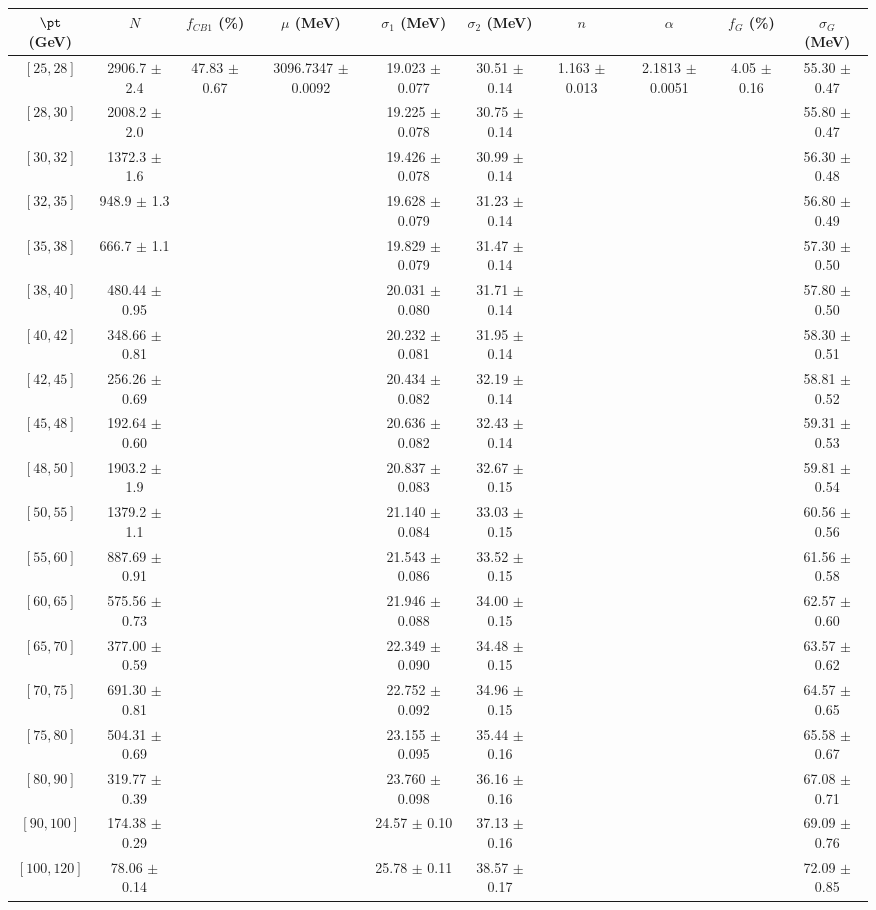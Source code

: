 \begin{tabular}{c||c|c|c|c|c|c|c|c|c}
$\pt$ (GeV) & $N$ & $f_{CB1}$ (\%)  & $\mu$ (MeV) & $\sigma_1$ (MeV) & $\sigma_2$ (MeV) & $n$ & $\alpha$ & $f_G$ (\%) & $\sigma_G$ (MeV) \\
\hline
$[25, 28]$ & 2906.7 $\pm$ 2.4 & \multirow{19}{*}{47.83 $\pm$ 0.67} & \multirow{19}{*}{3096.7347 $\pm$ 0.0092} & 19.023 $\pm$ 0.077 & 30.51 $\pm$ 0.14 & \multirow{19}{*}{1.163 $\pm$ 0.013} & \multirow{19}{*}{2.1813 $\pm$ 0.0051} & \multirow{19}{*}{4.05 $\pm$ 0.16} & 55.30 $\pm$ 0.47\\
$[28, 30]$ & 2008.2 $\pm$ 2.0 &  &  & 19.225 $\pm$ 0.078 & 30.75 $\pm$ 0.14 &  &  &  & 55.80 $\pm$ 0.47\\
$[30, 32]$ & 1372.3 $\pm$ 1.6 &  &  & 19.426 $\pm$ 0.078 & 30.99 $\pm$ 0.14 &  &  &  & 56.30 $\pm$ 0.48\\
$[32, 35]$ & 948.9 $\pm$ 1.3 &  &  & 19.628 $\pm$ 0.079 & 31.23 $\pm$ 0.14 &  &  &  & 56.80 $\pm$ 0.49\\
$[35, 38]$ & 666.7 $\pm$ 1.1 &  &  & 19.829 $\pm$ 0.079 & 31.47 $\pm$ 0.14 &  &  &  & 57.30 $\pm$ 0.50\\
$[38, 40]$ & 480.44 $\pm$ 0.95 &  &  & 20.031 $\pm$ 0.080 & 31.71 $\pm$ 0.14 &  &  &  & 57.80 $\pm$ 0.50\\
$[40, 42]$ & 348.66 $\pm$ 0.81 &  &  & 20.232 $\pm$ 0.081 & 31.95 $\pm$ 0.14 &  &  &  & 58.30 $\pm$ 0.51\\
$[42, 45]$ & 256.26 $\pm$ 0.69 &  &  & 20.434 $\pm$ 0.082 & 32.19 $\pm$ 0.14 &  &  &  & 58.81 $\pm$ 0.52\\
$[45, 48]$ & 192.64 $\pm$ 0.60 &  &  & 20.636 $\pm$ 0.082 & 32.43 $\pm$ 0.14 &  &  &  & 59.31 $\pm$ 0.53\\
$[48, 50]$ & 1903.2 $\pm$ 1.9 &  &  & 20.837 $\pm$ 0.083 & 32.67 $\pm$ 0.15 &  &  &  & 59.81 $\pm$ 0.54\\
$[50, 55]$ & 1379.2 $\pm$ 1.1 &  &  & 21.140 $\pm$ 0.084 & 33.03 $\pm$ 0.15 &  &  &  & 60.56 $\pm$ 0.56\\
$[55, 60]$ & 887.69 $\pm$ 0.91 &  &  & 21.543 $\pm$ 0.086 & 33.52 $\pm$ 0.15 &  &  &  & 61.56 $\pm$ 0.58\\
$[60, 65]$ & 575.56 $\pm$ 0.73 &  &  & 21.946 $\pm$ 0.088 & 34.00 $\pm$ 0.15 &  &  &  & 62.57 $\pm$ 0.60\\
$[65, 70]$ & 377.00 $\pm$ 0.59 &  &  & 22.349 $\pm$ 0.090 & 34.48 $\pm$ 0.15 &  &  &  & 63.57 $\pm$ 0.62\\
$[70, 75]$ & 691.30 $\pm$ 0.81 &  &  & 22.752 $\pm$ 0.092 & 34.96 $\pm$ 0.15 &  &  &  & 64.57 $\pm$ 0.65\\
$[75, 80]$ & 504.31 $\pm$ 0.69 &  &  & 23.155 $\pm$ 0.095 & 35.44 $\pm$ 0.16 &  &  &  & 65.58 $\pm$ 0.67\\
$[80, 90]$ & 319.77 $\pm$ 0.39 &  &  & 23.760 $\pm$ 0.098 & 36.16 $\pm$ 0.16 &  &  &  & 67.08 $\pm$ 0.71\\
$[90, 100]$ & 174.38 $\pm$ 0.29 &  &  & 24.57 $\pm$ 0.10 & 37.13 $\pm$ 0.16 &  &  &  & 69.09 $\pm$ 0.76\\
$[100, 120]$ & 78.06 $\pm$ 0.14 &  &  & 25.78 $\pm$ 0.11 & 38.57 $\pm$ 0.17 &  &  &  & 72.09 $\pm$ 0.85\\
\end{tabular}

